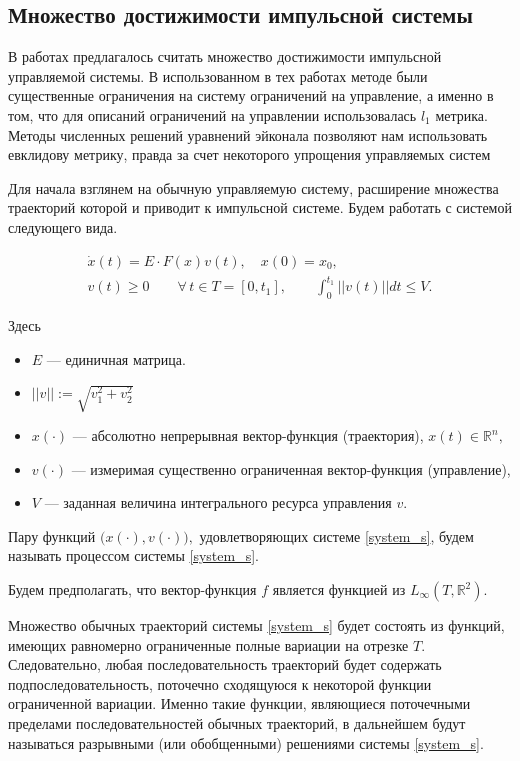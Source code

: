 \subsection{Множество достижимости импульсной системы}
\label{sec:ids}

В работах \cite{AVS2016, AV2015_1,AV2015_2} предлагалось считать
множество достижимости импульсной управляемой системы. В
использованном в тех работах методе были существенные ограничения на
систему ограничений на управление, а именно в том, что для описаний
ограничений на управлении использовалась $l_1$ метрика. Методы
численных решений уравнений эйконала позволяют нам использовать
евклидову метрику, правда за счет некоторого упрощения управляемых систем

Для начала взглянем на обычную управляемую систему, расширение
множества траекторий которой и приводит к импульсной системе. Будем
работать с системой следующего вида. 

\begin{equation}
  \label{system_s}
  \begin{array}{l}
    \dot{x}(t)=E \cdot F(x)v(t), \quad x(0)=x_0, \\[8pt]
    v(t)\geq 0  \qquad \forall\, t\in T = [0,t_1], \qquad
    \displaystyle\int_{0}^{t_1} ||v(t)||dt\leq V.
  \end{array} 
\end{equation}

Здесь
\begin{itemize}
  \item $E$ --- единичная матрица.
  \item $||v||:=\sqrt{v_1^2+v_2^2}$
  \item $x(\cdot)$ --- абсолютно непрерывная вектор-функция
    (траектория), $x(t)\in {\mathbb R}^n,$
  \item $v(\cdot)$ --- измеримая существенно ограниченная
    вектор-функция (управление),
  
  \item $V$ --- заданная величина интегрального ресурса управления
    $v$.
\end{itemize}

Пару функций $\bigl(x(\cdot),v(\cdot)\bigr),$ удовлетворяющих
системе \eqref{system_s}, будем называть процессом системы \eqref{system_s}.

Будем предполагать, что вектор-функция $f$ является функцией из
$L_{\infty}(T,\mathbb{R}^2)$.
     
Множество обычных траекторий системы \eqref{system_s} будет состоять
из функций, имеющих равномерно ограниченные полные вариации на отрезке
$T$. Следовательно, любая последовательность траекторий будет
содержать подпоследовательность, поточечно сходящуюся к некоторой
функции ограниченной вариации. Именно такие функции, являющиеся
поточечными пределами последовательностей обычных траекторий, в
дальнейшем будут называться разрывными (или обобщенными) решениями
системы \eqref{system_s}.

